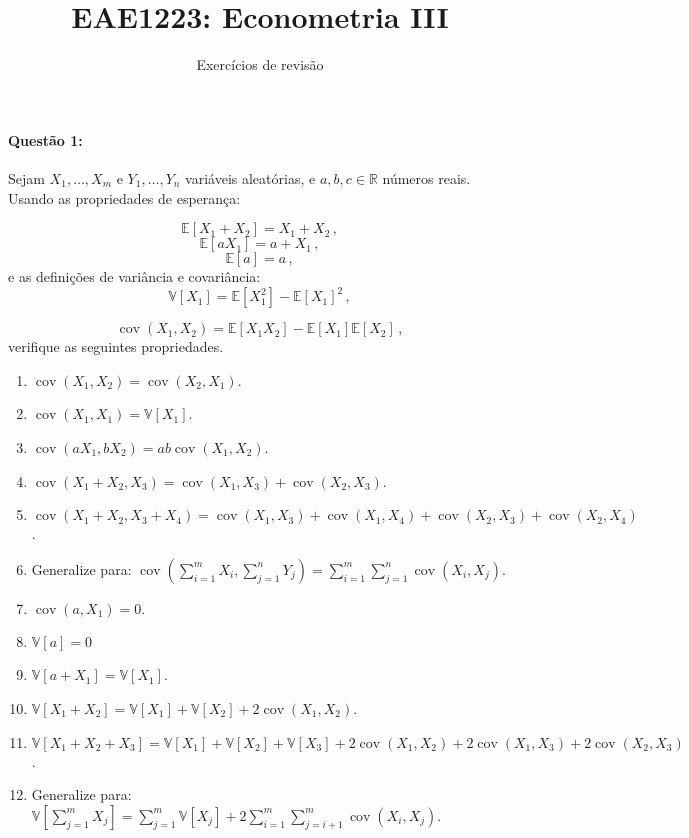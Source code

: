 \documentclass[10pt,a4paper]{article}
\title{\large EAE1223: Econometria III}
\author{\normalsize Exercícios de revisão}
\date{}
\begin{document}
	\maketitle
	\paragraph{Questão 1:} Sejam $X_1,\ldots,X_m$ e $Y_1,\ldots, Y_n$ variáveis aleatórias, e $a,b,c \in \mathbb{R}$ números reais. Usando as propriedades de esperança:
	
	$$\mathbb{E}[X_1 + X_2] = X_1 + X_2 \, ,$$
	$$\mathbb{E}[aX_1] = a + X_1 \, ,$$
	$$\mathbb{E}[a] = a \, ,$$
	e as definições de variância e covariância:
		$$\mathbb{V}[X_1] = \mathbb{E}[X_1^2] - \mathbb{E}[X_1]^2\,,$$

$$\operatorname{cov}(X_1,X_2) = \mathbb{E}[X_1X_2] - \mathbb{E}[X_1]\mathbb{E}[X_2]\,,$$
verifique as seguintes propriedades.

\begin{enumerate}
	\item $\operatorname{cov}(X_1,X_2) = \operatorname{cov}(X_2,X_1)$.
	\item $\operatorname{cov}(X_1,X_1) =  \mathbb{V}[X_1]$.
	\item $\operatorname{cov}(aX_1,bX_2) =  ab\operatorname{cov}(X_1,X_2)$.
	\item $\operatorname{cov}(X_1 + X_2,X_3) =  \operatorname{cov}(X_1,X_3) + \operatorname{cov}(X_2,X_3)$.
	\item $\operatorname{cov}(X_1 + X_2,X_3 + X_4) = \operatorname{cov}(X_1,X_3) + \operatorname{cov}(X_1,X_4) + \operatorname{cov}(X_2,X_3) + \operatorname{cov}(X_2,X_4)$.
	\item Generalize para: $\operatorname{cov}(\sum_{i=1}^mX_i,\sum_{j=1}^n Y_j) = \sum_{i=1}^{m}\sum_{j=1}^{n} \operatorname{cov}(X_i,X_j)$. 
	\item $\operatorname{cov}(a,X_1) = 0$.
	\item $\mathbb{V}[a] = 0$
	\item $\mathbb{V}[a + X_1] = \mathbb{V}[X_1]$.
	\item $\mathbb{V}[X_1 + X_2] = \mathbb{V}[X_1] + \mathbb{V}[X_2] + 2 \operatorname{cov}(X_1,X_2)$.
	\item $\mathbb{V}[X_1 + X_2 + X_3] = \mathbb{V}[X_1] + \mathbb{V}[X_2] +  \mathbb{V}[X_3]+ 2 \operatorname{cov}(X_1,X_2) + 2 \operatorname{cov}(X_1,X_3) + 2 \operatorname{cov}(X_2,X_3)$.
	\item Generalize para: $\mathbb{V}[\sum_{j=1}^{m}X_j] = \sum_{j=1}^m \mathbb{V}[X_j] + 2\sum_{i=1}^m \sum_{j=i+1}^m \operatorname{cov}(X_i,X_j)$.

\end{enumerate}
\end{document}
